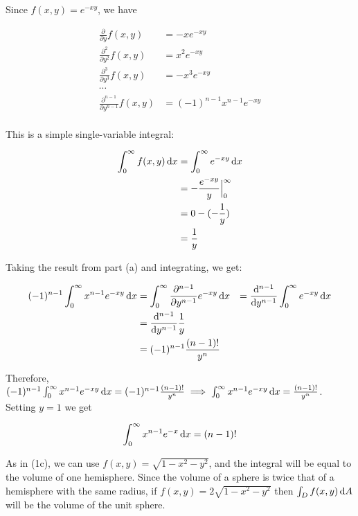
Since $f(x, y) = e^{-xy}$, we have

\begin{align*}
  \frac{\partial}{\partial y} f(x, y) &= -xe^{-xy} \\
  \frac{\partial^2}{\partial y^2} f(x, y) &= x^2e^{-xy} \\
  \frac{\partial^3}{\partial y^3} f(x, y) &= -x^3e^{-xy} \\
  \cdots \\
  \frac{\partial^{n - 1}}{\partial y^{n - 1}} f(x, y) &= (-1)^{n - 1}x^{n - 1}e^{-xy} \\
\end{align*}

This is a simple single-variable integral:

\begin{align*}
  \int_0^{\infty} f(x, y) \mathop{}\!\mathrm{d} x &= \int_0^{\infty} e^{-xy} \mathop{}\!\mathrm{d} x \\
  &= -\frac{e^{-xy}}{y} \Big|_0^{\infty} \\
  &= 0 - (-\frac{1}{y}) \\
  &= \frac{1}{y}
\end{align*}

Taking the result from part (a) and integrating, we get:

\begin{align*}
  (-1)^{n - 1} \int_0^{\infty} x^{n - 1} e^{-xy} \mathop{}\!\mathrm{d} x &= \int_0^{\infty} \frac{\partial^{n - 1}}{\partial y^{n - 1}} e^{-xy} \mathop{}\!\mathrm{d} x
  &= \frac{\mathop{}\!\mathrm{d}^{n - 1}}{\mathop{}\!\mathrm{d} y^{n - 1}} \int_0^{\infty} e^{-xy} \mathop{}\!\mathrm{d} x \\
  &= \frac{\mathop{}\!\mathrm{d}^{n - 1}}{\mathop{}\!\mathrm{d} y^{n - 1}} \frac{1}{y} \\
  &= (-1)^{n - 1} \frac{(n - 1)!}{y^n}
\end{align*}

Therefore, $(-1)^{n - 1} \int_0^{\infty} x^{n - 1} e^{-xy} \mathop{}\!\mathrm{d} x = (-1)^{n - 1} \frac{(n - 1)!}{y^n} \implies \int_0^{\infty} x^{n - 1} e^{-xy} \mathop{}\!\mathrm{d} x = \frac{(n - 1)!}{y^n}$. Setting $y = 1$ we get

\begin{align*}
  \int_0^{\infty} x^{n - 1} e^{-x} \mathop{}\!\mathrm{d} x = (n - 1)!
\end{align*}


As in (1c), we can use $f(x, y) = \sqrt{1 - x^2 - y^2}$, and the integral will be equal to the volume of one hemisphere. Since the volume of a sphere is twice that of a hemisphere with the same radius, if $f(x, y) = 2\sqrt{1 - x^2 - y^2}$ then $\int_D f(x, y) \mathop{}\!\mathrm{d} A$ will be the volume of the unit sphere.

